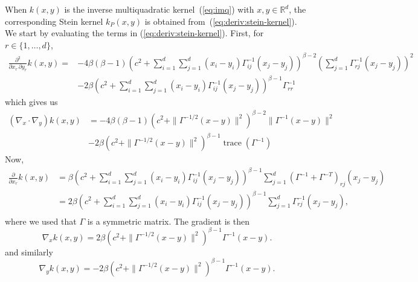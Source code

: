 \documentclass[11pt,a4paper]{report}
\DeclareMathOperator{\trace}{trace}
\begin{document}
When $k(x,y)$ is the inverse multiquadratic kernel~(\ref{eq:imq}) with $x, y \in \mathbb{R}^d$, the corresponding Stein kernel $k_P(x, y)$ is obtained from~(\ref{eq:deriv:stein-kernel}). We start by evaluating the terms in (\ref{eq:deriv:stein-kernel}). First, for $r \in \{1, \dots, d\}$,
\begin{equation}
\begin{aligned}
\frac{\partial^2}{\partial x_r\,\partial y_r} k(x,y) 
= &-4 \beta(\beta-1) \left(c^2 + \sum_{i=1}^d\sum_{j=1}^d (x_i-y_i) \Gamma^{-1}_{ij}(x_j-y_j)\right)^{\beta-2} \left(\sum_{j=1}^d \Gamma^{-1}_{rj}(x_j - y_j)\right)^2 \\
&- 2\beta \left(c^2 + \sum_{i=1}^d\sum_{j=1}^d (x_i-y_i) \Gamma^{-1}_{ij}(x_j-y_j)\right)^{\beta-1} \Gamma^{-1}_{rr}
\end{aligned}
\end{equation}
which gives us
\begin{equation}
\begin{aligned}
(\nabla_x \cdot \nabla_y) k(x,y) 
&= -4 \beta(\beta-1) \left(c^2 + \| \Gamma^{-1/2}(x-y)\|^2\right)^{\beta-2} \| \Gamma^{-1}(x - y)\|^2 \\
&- 2\beta \left(c^2 + \|\Gamma^{-1/2}(x-y)\|^2\right)^{\beta-1} \trace(\Gamma^{-1})
\label{eq:appx:deriv:nablax_nablay}
\end{aligned}
\end{equation}
Now,
\begin{equation}
\begin{aligned}
\frac{\partial}{\partial x_r} k(x,y) 
&= \beta \left(c^2 + \sum_{i=1}^d\sum_{j=1}^d (x_i-y_i) \Gamma^{-1}_{ij}(x_j-y_j)\right)^{\beta-1}
\sum_{j=1}^d (\Gamma^{-1} + \Gamma^{-T})_{rj}(x_j - y_j) \\
&= 2 \beta \left(c^2 + \sum_{i=1}^d\sum_{j=1}^d (x_i-y_i) \Gamma^{-1}_{ij}(x_j-y_j)\right)^{\beta-1}
\sum_{j=1}^d \Gamma^{-1}_{rj}(x_j - y_j), \\
\end{aligned}
\end{equation}
where we used that $\Gamma$ is a symmetric matrix. The gradient is then
\begin{equation}
\nabla_x k(x,y) = 2 \beta \left(c^2 + \| \Gamma^{-1/2} (x-y)\|^2\right)^{\beta-1} \Gamma^{-1} (x - y).
\label{eq:appx:deviv:nablax}
\end{equation}
and similarly
\begin{equation}
\nabla_y k(x,y) = -2 \beta \left(c^2 + \| \Gamma^{-1/2} (x-y)\|^2\right)^{\beta-1} \Gamma^{-1} (x - y).
\label{eq:appx:deviv:nablay}
\end{equation}
\end{document}
